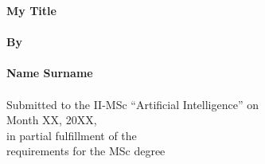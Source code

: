     




\begin{center}
    \Large{\textbf{My Title}} \\~\\
    \Large{\textbf{By}} \\~\\
    \Large{\textbf{Name Surname}} \\~\\
    
    \large{Submitted to the II-MSc “Artificial Intelligence” on \\ Month XX, 20XX, \\ in partial fulfillment of the \\ requirements for the MSc degree \\~\\}
\end{center}

